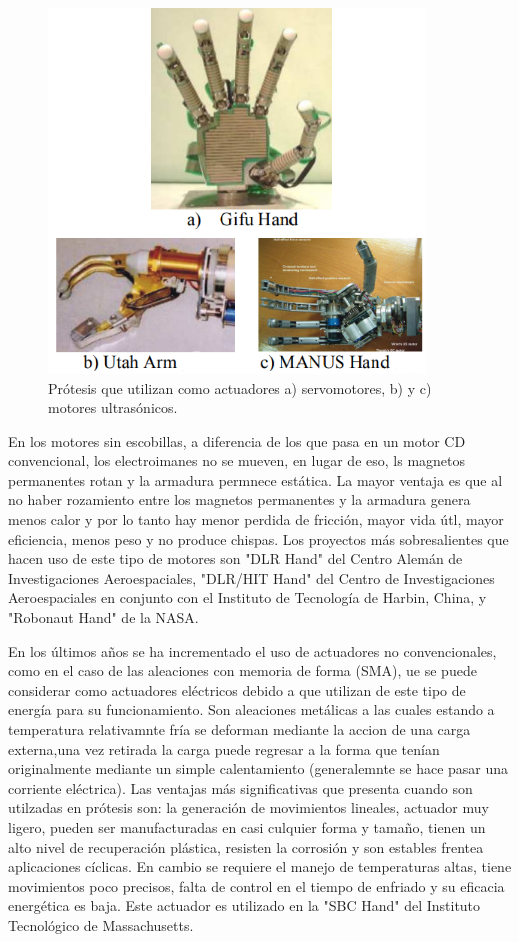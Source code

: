 \documentclass{article}
\begin{document}
\begin{figure}[H] %
    \centering
    \includegraphics[width=100mm]{Protesis 2.png} %
    \caption{Prótesis que utilizan como actuadores a) servomotores, b) y c) motores ultrasónicos\cite{ff2}.}
    \label{grafica:cinco}
\end{figure}

En los motores sin escobillas, a diferencia de los que pasa en un motor CD convencional, los electroimanes no se mueven, en lugar de eso, ls magnetos permanentes rotan y la armadura permnece estática. La mayor ventaja es que al no haber rozamiento entre los magnetos permanentes y la armadura genera menos calor y por lo tanto hay menor perdida de fricción, mayor vida útl, mayor eficiencia, menos peso y no produce chispas. Los proyectos más sobresalientes que hacen uso de este tipo de motores son "DLR Hand" del Centro Alemán de Investigaciones Aeroespaciales, "DLR/HIT Hand" del Centro de Investigaciones Aeroespaciales en conjunto con el Instituto de Tecnología de Harbin, China, y "Robonaut Hand" de la NASA\cite{ff2}. 

En los últimos años se ha incrementado el uso de actuadores no convencionales, como en el caso de las aleaciones con memoria de forma (SMA), ue se puede considerar como actuadores eléctricos debido a que utilizan de este tipo de energía para su funcionamiento. Son aleaciones metálicas a las cuales estando a temperatura relativamnte fría se deforman mediante la accion de una carga externa,una vez retirada la carga puede regresar a la forma que tenían originalmente mediante un simple calentamiento (generalemnte se hace pasar una corriente eléctrica). Las ventajas más significativas que presenta cuando son utilzadas en prótesis son: la generación de movimientos lineales, actuador muy ligero, pueden ser manufacturadas en casi culquier forma y tamaño, tienen un alto nivel de recuperación plástica, resisten la corrosión y son estables frentea aplicaciones cíclicas. En cambio se requiere el manejo de temperaturas altas, tiene movimientos poco precisos, falta de control en el tiempo de enfriado y su eficacia energética es baja. Este actuador es utilizado en la "SBC Hand" del Instituto Tecnológico de Massachusetts\cite{ff2}. 
\end{document}
